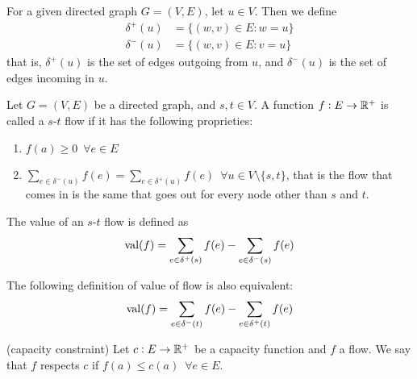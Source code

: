 \documentclass[12pt]{extarticle}
\begin{document}
\begin{definition}
    For a given directed graph $G = (V, E)$, let $u \in V$. Then we define
    \begin{align}
        \delta^+(u) & = \{(w, v) \in E : w = u\} \label{eq:flow:delta_plus}  \\
        \delta^-(u) & = \{(w, v) \in E : v = u\} \label{eq:flow:delta_minus}
    \end{align}
    that is, $\delta^+(u)$ is the set of edges outgoing from $u$, and $\delta^-(u)$ is the set of edges incoming in $u$.
\end{definition}

\begin{definition}[flow]
    \label{def:flow:flow}
    Let $G = (V, E)$ be a directed graph, and $s,t \in V$.
    A function $f:E \to \mathbb{R}^+$ is called a $s$-$t$ flow if it has the following proprieties:
    \begin{enumerate}[label=\roman*.]
        \item $f(a) \geq 0 \enspace \forall e \in E$
        \item $\sum_{e \in \delta^-(u)} f(e) = \sum_{e \in \delta^+(u)} f(e) \enspace \forall u \in V \setminus \{ s, t \}$, that is the flow that comes in is the same that goes out for every node other than $s$ and $t$.
    \end{enumerate}
\end{definition}

\begin{definition}
    The value of an $s$-$t$ flow is defined as \begin{equation}
        {\operatorfont val} (f) = \sum_{e \in \delta^+(s)} f(e) - \sum_{e \in \delta^-(s)} f(e)
    \end{equation}
\end{definition}

\begin{remark}
    The following definition of value of flow is also equivalent:
    \begin{equation}
        {\operatorfont val} (f) = \sum_{e \in \delta^-(t)} f(e) - \sum_{e \in \delta^+(t)} f(e)
    \end{equation}
\end{remark}

\begin{definition}(capacity constraint)
    \label{def:flow:capacity_constraint}
    Let $c: E \to \mathbb{R}^+$ be a capacity function and $f$ a flow.
    We say that $f$ respects $c$ if $f(a)\leq c(a) \enspace \forall e \in E$.
\end{definition}
\end{document}
